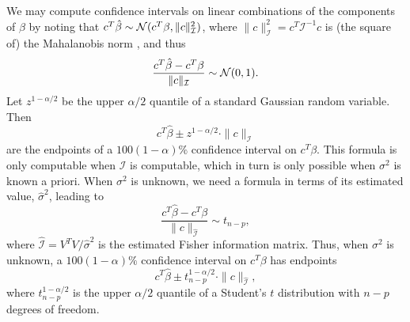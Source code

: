 \documentclass[12pt]{article}
\begin{document}
We may compute confidence intervals on linear combinations of the components of $\beta$ by noting that $c^T \hat{\beta} \sim {\mathcal N} (c^T \beta, \| c \|_\mathcal{I}^2)$, where $\| c \|_\mathcal{I}^2 = c^T \mathcal{I}^{-1} c$ is (the square of) the Mahalanobis norm \cite[\S~3.11.1]{Seber:2003}, and thus
\begin{equation}
\label{eqn:dist_ctbeta}
   \frac{c^T \hat{\beta} - c^T \beta}{\|c\|_\mathcal{I}} \sim {\mathcal N}(0, 1).
\end{equation}
Let $z^{1-\alpha/2}$ be the upper $\alpha/2$ quantile of a standard Gaussian random variable. Then
\begin{equation}
\label{eqn:ci_beta}
c^T \hat{\beta} \pm z^{1-\alpha/2} \cdot \|c\|_\mathcal{I}
\end{equation}
are the endpoints of a $100(1-\alpha)\%$ confidence interval on $c^T \beta$. This formula is only computable when $\mathcal{I}$ is computable, which in turn is only possible when $\sigma^2$ is known a priori. When $\sigma^2$ is unknown, we need a formula in terms of its estimated value, $\hat{\sigma}^2$, leading to
\begin{displaymath}
   \frac{c^T \hat{\beta} - c^T \beta}{\| c \|_{\hat{\mathcal{I}}}} \sim t_{n-p},
\end{displaymath}
where $\hat{\mathcal{I}} = V^T V / \hat{\sigma}^2$ is the estimated Fisher information matrix. Thus, when $\sigma^2$ is unknown, a $100(1-\alpha)\%$ confidence interval on $c^T \beta$ has endpoints
\begin{equation}
\label{eqn:ci_beta_estimated_variance}
c^T \hat{\beta} \pm t_{n-p}^{1-\alpha/2} \cdot \| c \|_{\hat{\mathcal{I}}},
\end{equation}
where $t_{n-p}^{1-\alpha/2}$ is the upper $\alpha/2$ quantile of a Student's $t$ distribution with $n-p$ degrees of freedom.
\end{document}

